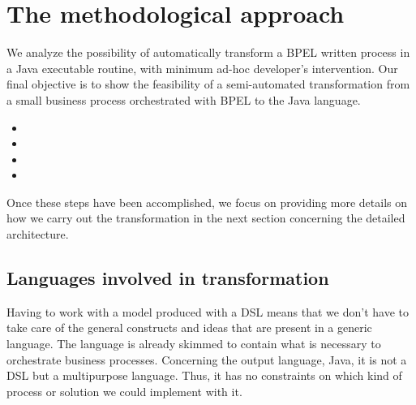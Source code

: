\section{The methodological approach}
\label{MethodApproach}

We analyze the possibility of automatically transform a BPEL written process in a Java executable routine, with minimum ad-hoc developer’s intervention. Our final objective is to show the feasibility of a semi-automated transformation from a small business process orchestrated with BPEL to the Java language.

\begin{itemize}
 \item {}
 \item {}
 \item {}
 \item {}
\end{itemize}  

Once these steps have been accomplished, we focus on providing more details on how we carry out the transformation in the next section concerning the detailed architecture.


\subsection{Languages involved in transformation} 
\label{sec:TransfDomain}
Having to work with a model produced with a DSL means that we don't have to take care of the general constructs and ideas that are present in a generic language. The language is already skimmed to contain what is necessary to orchestrate business processes.
Concerning the output language, Java, it is not a DSL but a multipurpose language. Thus, it has no constraints on which kind of process or solution we could implement with it. %

